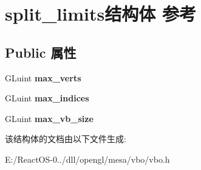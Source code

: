 \hypertarget{structsplit__limits}{}\section{split\+\_\+limits结构体 参考}
\label{structsplit__limits}
\subsection*{Public 属性}
\begin{DoxyCompactItemize}
\item 
\mbox{\label{structsplit__limits_acf91298465d7dfe52fea4e1e0a96c444}} 
G\+Luint {\bfseries max\+\_\+verts}
\item 
\mbox{\label{structsplit__limits_ad63a2a01587737f7044d6717df648789}} 
G\+Luint {\bfseries max\+\_\+indices}
\item 
\mbox{\label{structsplit__limits_a382064ba4e6118ebb579fd24ba7d60ee}} 
G\+Luint {\bfseries max\+\_\+vb\+\_\+size}
\end{DoxyCompactItemize}


该结构体的文档由以下文件生成\+:\begin{DoxyCompactItemize}
\item 
E\+:/\+React\+O\+S-\/0../dll/opengl/mesa/vbo/vbo.\+h\end{DoxyCompactItemize}

